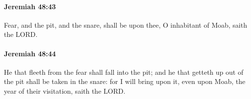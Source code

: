 		\paragraph{Jeremiah 48:43} %
			\label{JEREMIAH-48-43}

			Fear, and the pit, and the snare, shall be upon thee, O inhabitant of Moab, saith the LORD.


		\paragraph{Jeremiah 48:44} %
			\label{JEREMIAH-48-44}

			He that fleeth from the fear shall fall into the pit; and he that getteth up out of the pit shall be taken in the snare: for I will bring upon it, even upon Moab, the year of their visitation, saith the LORD.



